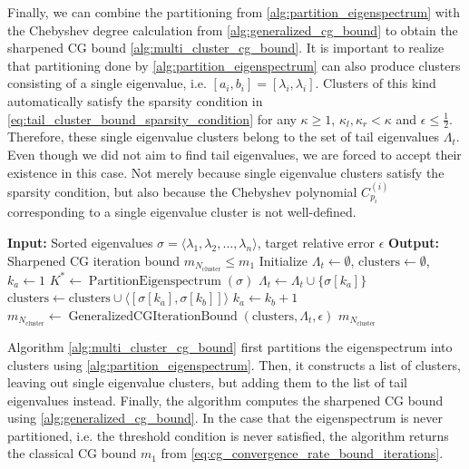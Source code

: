 Finally, we can combine the partitioning from \cref{alg:partition_eigenspectrum} with the Chebyshev degree calculation from \cref{alg:generalized_cg_bound} to obtain the sharpened CG bound \cref{alg:multi_cluster_cg_bound}. It is important to realize that partitioning done by \cref{alg:partition_eigenspectrum} can also produce clusters consisting of a single eigenvalue, i.e. $[a_i, b_i] = [\lambda_i, \lambda_i]$. Clusters of this kind automatically satisfy the sparsity condition in \cref{eq:tail_cluster_bound_sparsity_condition} for any $\kappa\geq1$, $\kappa_l,\kappa_r<\kappa$ and $\epsilon\leq\frac{1}{2}$. Therefore, these single eigenvalue clusters belong to the set of tail eigenvalues $\Lambda_t$. Even though we did not aim to find tail eigenvalues, we are forced to accept their existence in this case. Not merely because single eigenvalue clusters satisfy the sparsity condition, but also because the Chebyshev polynomial $C^{(i)}_{p_i}$ corresponding to a single eigenvalue cluster is not well-defined.
\begin{algorithm}[H]
    \caption{$\operatorname{MultiClusterCGIterationBound}(\sigma, \epsilon)$}
    \begin{algorithmic}[1]
        \State \textbf{Input:} Sorted eigenvalues $\sigma = \langle\lambda_1, \lambda_2, \ldots, \lambda_n\rangle$, target relative error $\epsilon$
        \State \textbf{Output:} Sharpened CG iteration bound $m_{N_{\text{cluster}}} \leq m_1$
        \State Initialize $\Lambda_t \gets \emptyset$, $\text{clusters} \gets \emptyset$, $k_a \gets 1$
        \State $K^* \gets \operatorname{PartitionEigenspectrum}(\sigma)$
            \State $\Lambda_t \gets \Lambda_t \cup \{\sigma[k_a]\}$ 
        \Else
            \State $\text{clusters} \gets \text{clusters} \cup \langle[\sigma[k_a], \sigma[k_b]]\rangle$
        \EndIf
        \State $k_a \gets k_b + 1$
        \EndFor
        \State $m_{N_{\text{cluster}}} \gets \operatorname{GeneralizedCGIterationBound}(\text{clusters}, \Lambda_t, \epsilon)$
        \State \Return $m_{N_{\text{cluster}}}$
    \end{algorithmic}
    \label{alg:multi_cluster_cg_bound}
\end{algorithm}
Algorithm \ref{alg:multi_cluster_cg_bound} first partitions the eigenspectrum into clusters using \cref{alg:partition_eigenspectrum}. Then, it constructs a list of clusters, leaving out single eigenvalue clusters, but adding them to the list of tail eigenvalues instead. Finally, the algorithm computes the sharpened CG bound using \cref{alg:generalized_cg_bound}. In the case that the eigenspectrum is never partitioned, i.e. the threshold condition is never satisfied, the algorithm returns the classical CG bound $m_1$ from \cref{eq:cg_convergence_rate_bound_iterations}.

